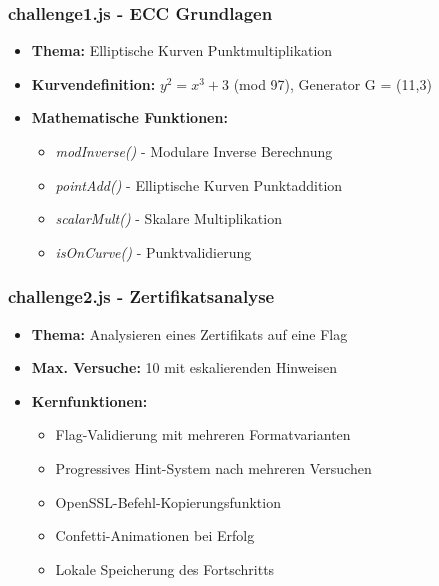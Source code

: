 \documentclass{article}
\begin{document}
\subsubsection{challenge1.js - ECC Grundlagen}
\begin{itemize}
    \item \textbf{Thema:} Elliptische Kurven Punktmultiplikation
    \item \textbf{Kurvendefinition:} $y^2 = x^3 + 3$ (mod 97), Generator G = (11,3)
    \item \textbf{Mathematische Funktionen:}
    \begin{itemize}
        \item \emph{modInverse()} - Modulare Inverse Berechnung
        \item \emph{pointAdd()} - Elliptische Kurven Punktaddition
        \item \emph{scalarMult()} - Skalare Multiplikation
        \item \emph{isOnCurve()} - Punktvalidierung
    \end{itemize}
\end{itemize}

\subsubsection{challenge2.js - Zertifikatsanalyse}
\begin{itemize}
    \item \textbf{Thema:} Analysieren eines Zertifikats auf eine Flag
    \item \textbf{Max. Versuche:} 10 mit eskalierenden Hinweisen
    \item \textbf{Kernfunktionen:}
    \begin{itemize}
        \item Flag-Validierung mit mehreren Formatvarianten
        \item Progressives Hint-System nach mehreren Versuchen
        \item OpenSSL-Befehl-Kopierungsfunktion
        \item Confetti-Animationen bei Erfolg
        \item Lokale Speicherung des Fortschritts
    \end{itemize}
\end{itemize}
\end{document}
